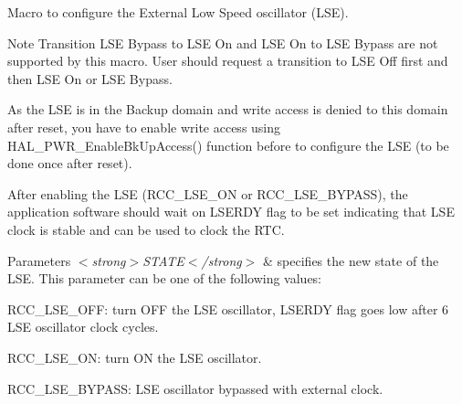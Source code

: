 Macro to configure the External Low Speed oscillator (L\+SE). 

\begin{DoxyNote}{Note}
Transition L\+SE Bypass to L\+SE On and L\+SE On to L\+SE Bypass are not supported by this macro. User should request a transition to L\+SE Off first and then L\+SE On or L\+SE Bypass. 

As the L\+SE is in the Backup domain and write access is denied to this domain after reset, you have to enable write access using H\+A\+L\+\_\+\+P\+W\+R\+\_\+\+Enable\+Bk\+Up\+Access() function before to configure the L\+SE (to be done once after reset). 

After enabling the L\+SE (R\+C\+C\+\_\+\+L\+S\+E\+\_\+\+ON or R\+C\+C\+\_\+\+L\+S\+E\+\_\+\+B\+Y\+P\+A\+SS), the application software should wait on L\+S\+E\+R\+DY flag to be set indicating that L\+SE clock is stable and can be used to clock the R\+TC. 
\end{DoxyNote}

\begin{DoxyParams}{Parameters}
{\em $<$strong$>$\+S\+T\+A\+T\+E$<$/strong$>$} & specifies the new state of the L\+SE. This parameter can be one of the following values\+: \begin{DoxyItemize}
\item R\+C\+C\+\_\+\+L\+S\+E\+\_\+\+O\+FF\+: turn O\+FF the L\+SE oscillator, L\+S\+E\+R\+DY flag goes low after 6 L\+SE oscillator clock cycles. \item R\+C\+C\+\_\+\+L\+S\+E\+\_\+\+ON\+: turn ON the L\+SE oscillator. \item R\+C\+C\+\_\+\+L\+S\+E\+\_\+\+B\+Y\+P\+A\+SS\+: L\+SE oscillator bypassed with external clock. \end{DoxyItemize}
\\
\hline
\end{DoxyParams}
